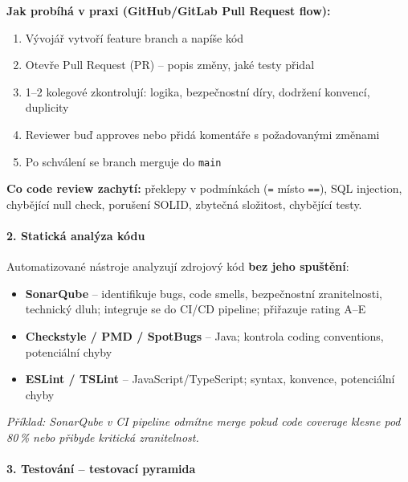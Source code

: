 \textbf{Jak probíhá v praxi (GitHub/GitLab Pull Request flow):}
\begin{enumerate}
  \item Vývojář vytvoří feature branch a napíše kód
  \item Otevře Pull Request (PR) -- popis změny, jaké testy přidal
  \item 1--2 kolegové zkontrolují: logika, bezpečnostní díry, dodržení konvencí, duplicity
  \item Reviewer buď approves nebo přidá komentáře s požadovanými změnami
  \item Po schválení se branch merguje do \texttt{main}
\end{enumerate}

\textbf{Co code review zachytí:}
překlepy v podmínkách (\texttt{=} místo \texttt{==}), SQL injection, chybějící null check, porušení SOLID,
zbytečná složitost, chybějící testy.

\paragraph{2. Statická analýza kódu}
Automatizované nástroje analyzují zdrojový kód \textbf{bez jeho spuštění}:

\begin{itemize}
  \item \textbf{SonarQube} -- identifikuje bugs, code smells, bezpečnostní zranitelnosti, technický dluh;
    integruje se do CI/CD pipeline; přiřazuje rating A--E
  \item \textbf{Checkstyle / PMD / SpotBugs} -- Java; kontrola coding conventions, potenciální chyby
  \item \textbf{ESLint / TSLint} -- JavaScript/TypeScript; syntax, konvence, potenciální chyby
\end{itemize}

\textit{Příklad: SonarQube v CI pipeline odmítne merge pokud code coverage klesne pod 80\,\% nebo přibyde kritická zranitelnost.}

\paragraph{3. Testování -- testovací pyramida}

